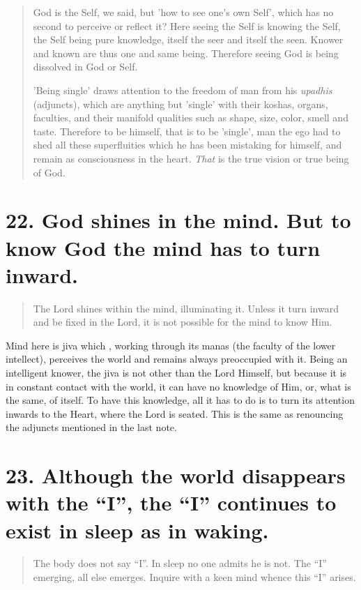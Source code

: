 \documentclass[12pt]{report}
\begin{document}
\begin{quote}
  God is the Self, we said, but 'how to see one's own Self', which has
  no second to perceive or reflect it? Here seeing the Self is knowing
  the Self, the Self being pure knowledge, itself the seer and itself
  the seen. Knower and known are thus one and same being. Therefore
  seeing God is being dissolved in God or Self.

  'Being single' draws attention to the freedom of man from his
  \emph{upadhis} (adjuncts), which are anything but 'single' with
  their koshas, organs, faculties, and their manifold qualities such
  as shape, size, color, smell and taste. Therefore to be himself,
  that is to be 'single', man the ego had to shed all these
  superfluities which he has been mistaking for himself, and remain as
  consciousness in the heart. \emph{That} is the true vision or true
  being of God.
\end{quote}


\section{22. God shines in the mind. But to know God the mind has to turn inward.} 

\begin{quote}
  The Lord shines within the mind, illuminating it. Unless it turn
  inward and be fixed in the Lord, it is not possible for the mind to
  know Him.
\end{quote}

Mind here is jiva which , working through its manas (the faculty of
the lower intellect), perceives the world and remains always
preoccupied with it. Being an intelligent knower, the jiva is not
other than the Lord Himself, but because it is in constant contact
with the world, it can have no knowledge of Him, or, what is the same,
of itself. To have this knowledge, all it has to do is to turn its
attention inwards to the Heart, where the Lord is seated. This is the
same as renouncing the adjuncts mentioned in the last note.


\section{23. Although the world disappears with the ``I'', the ``I'' continues to exist in sleep as in waking.}

\begin{quote}
  The body does not say ``I''. In sleep no one admits he is not. The
  ``I'' emerging, all else emerges. Inquire with a keen mind whence this
  ``I'' arises.
\end{quote}
\end{document}
